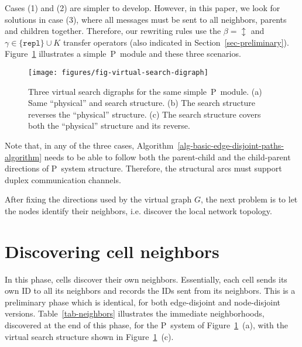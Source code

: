 \documentclass[preliminary,copyright,creativecommons]{eptcs}
\theoremstyle{remark}
\newcommand{\modrepl}{\mathtt{repl}}
\begin{document}
Cases (1) and (2) are simpler to develop. 
However, in this paper, we look for solutions in case (3), where 
all messages must be sent to all neighbors, parents and children together. 
Therefore, our rewriting rules use the $\beta = \updownarrow$ and
$\gamma \in \{ \modrepl \} \cup K$ transfer operators 
(also indicated in Section~\ref{sec-preliminary}).
Figure~\ref{fig-virtual-search-digraph} illustrates 
a simple~P~module and these three scenarios.

\begin{figure}[h]
\centerline{\texttt{[image: figures/fig-virtual-search-digraph]}}
\caption{Three virtual search digraphs for the same simple~P~module.
(a) Same ``physical'' and search structure.
(b) The search structure reverses the ``physical'' structure.
(c) The search structure covers both the ``physical'' structure and its reverse.}
\label{fig-virtual-search-digraph}
\end{figure}

Note that, in any of the three cases, 
Algorithm~\ref{alg-basic-edge-disjoint-paths-algorithm} needs to be able
to follow both the parent-child and the child-parent directions of P~system structure.
Therefore, the structural arcs must support duplex communication channels.

After fixing the directions used by the virtual graph $G$, 
the next problem is to let the nodes identify their neighbors, 
i.e. discover the local network topology.


\section{Discovering cell neighbors}
\label{sec-cell-neighborhoods}

In this phase, cells discover their own neighbors.
Essentially, each cell sends its own ID to all its neighbors and
records the IDs sent from its neighbors.
This is a preliminary phase which is identical, 
for both edge-disjoint and node-disjoint versions.
Table~\ref{tab-neighbors} illustrates the immediate neighborhoods,
discovered at the end of this phase, for the P~system of
Figure~\ref{fig-virtual-search-digraph}~(a), with
the virtual search structure shown in 
Figure~\ref{fig-virtual-search-digraph}~(c). 
\end{document}
